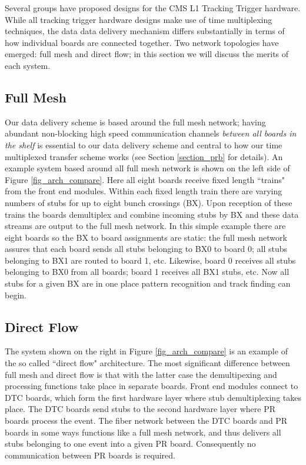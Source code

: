 \documentclass[letterpaper]{article}
\begin{document}
Several groups have proposed designs for the CMS L1 Tracking Trigger hardware.  While all tracking trigger hardware designs make use of time multiplexing techniques, the data data delivery mechanism differs substantially in terms of how individual boards are connected together.  Two network topologies have emerged: full mesh and direct flow; in this section we will discuss the merits of each system.

\subsection{Full Mesh}

Our data delivery scheme is based around the full mesh network; having abundant non-blocking high speed communication channels \emph{between all boards in the shelf} is essential to our data delivery scheme and central to how our time multiplexed transfer scheme works (see Section \ref{section_prb} for details).  An example system based around all full mesh network is shown on the left side of Figure \ref{fig_arch_compare}.  Here all eight boards receive fixed length ``trains" from the front end modules.  Within each fixed length train there are varying numbers of stubs for up to eight bunch crossings (BX).  Upon reception of these trains the boards demultiplex and combine incoming stubs by BX and these data streams are output to the full mesh network. In this simple example there are eight boards so the BX to board assignments are static: the full mesh network assures that each board sends all stubs belonging to BX0 to board 0; all stubs belonging to BX1 are routed to board 1, etc.  Likewise, board 0 receives all stubs belonging to BX0 from all boards; board 1 receives all BX1 stubs, etc.  Now all stubs for a given BX are in one place pattern recognition and track finding can begin.

\subsection{Direct Flow}

The system shown on the right in Figure \ref{fig_arch_compare} is an example of the so called ``direct flow" architecture.  
The most significant difference between full mesh and direct flow is that with the latter case the demultipexing and processing functions take place in separate boards.  Front end modules connect to DTC boards, which form the first hardware layer where stub demultiplexing takes place.  The DTC boards send stubs to the second hardware layer where PR boards process the event.  The fiber network between the DTC boards and PR boards in some ways functions like a full mesh network, and thus delivers all stubs belonging to one event into a given PR board.  Consequently no communication between PR boards is required.
\end{document}

